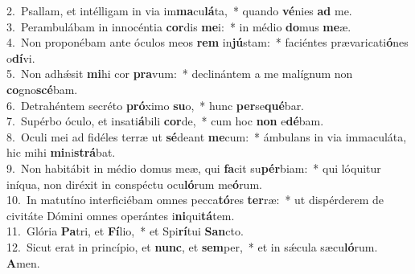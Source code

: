 {2.~}Psallam, et intélligam in via im\textbf{ma}cu\textbf{lá}ta,~* quando \textbf{vé}nies \textbf{ad} me.\\
{3.~}Perambulábam in innocéntia \textbf{cor}dis \textbf{me}i:~* in médio \textbf{do}mus \textbf{me}æ.\\
{4.~}Non proponébam ante óculos meos \textbf{rem} in\textbf{jú}stam:~* faciéntes prævaricati\textbf{ó}nes o\textbf{dí}vi.\\
{5.~}Non adhǽsit \textbf{mi}hi cor \textbf{pra}vum:~* declinántem a me malígnum non \textbf{co}gno\textbf{scé}bam.\\
{6.~}Detrahéntem secréto \textbf{pró}ximo \textbf{su}o,~* hunc \textbf{per}se\textbf{qué}bar.\\
{7.~}Supérbo óculo, et insati\textbf{á}bili \textbf{cor}de,~* cum hoc \textbf{non} e\textbf{dé}bam.\\
{8.~}Oculi mei ad fidéles terræ ut \textbf{sé}deant \textbf{me}cum:~* ámbulans in via immaculáta, hic mihi \textbf{mi}ni\textbf{strá}bat.\\
{9.~}Non habitábit in médio domus meæ, qui \textbf{fa}cit su\textbf{pér}biam:~* qui lóquitur iníqua, non diréxit in conspéctu ocu\textbf{ló}rum me\textbf{ó}rum.\\
{10.~}In matutíno interficiébam omnes pecca\textbf{tó}res \textbf{ter}ræ:~* ut dispérderem de civitáte Dómini omnes operántes i\textbf{ni}qui\textbf{tá}tem.\\
{11.~}Glória \textbf{Pa}tri, et \textbf{Fí}lio,~* et Spi\textbf{rí}tui \textbf{San}cto.\\
{12.~}Sicut erat in princípio, et \textbf{nunc}, et \textbf{sem}per,~* et in sǽcula sæcu\textbf{ló}rum. \textbf{A}men.\\
